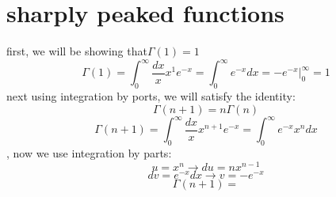 \documentclass{article}
\begin{document}
\section {sharply peaked functions}
first, we will be showing that$\Gamma (1)=1$
\begin{equation}
    \Gamma (1)=\int_{0}^{\infty } \frac{dx}{x}x^{1}e^{-x}=\int_{0}^{\infty } e^{-x}dx=-e^{-x}\Big|_{0}^{\infty }=1
\end{equation}
next using integration by ports, we will satisfy the identity:
\begin{equation}
    \Gamma (n+1)=n\Gamma (n)
\end{equation}
\begin{equation}
    \Gamma (n+1)=\int_{0}^{\infty } \frac{dx}{x}x^{n+1}e^{-x}=\int_{0}^{\infty } e^{-x}x^{n}dx
\end{equation}
, now we use integration by parts:
    \begin{equation}
        u= x^{n} \xrightarrow{} du= nx^{n-1} \end{equation}
    \begin{equation}
    dv= e^{-x}dx \xrightarrow{} v= -e^{-x}
    \end{equation}
\begin{equation}
    \Gamma (n+1)=
\end{equation}
\end{document}
